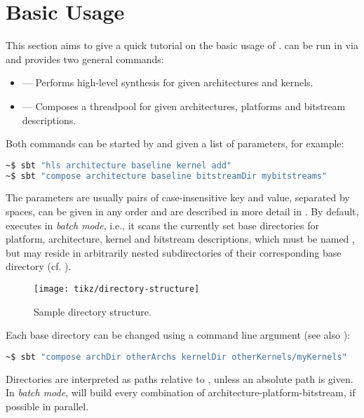 \section{Basic Usage}\label{sec:basic-usage}%
This section aims to give a quick tutorial on the basic usage of \tpc{}.
\tpc{} can be run in \tpchome{} via  and provides two general commands:

\begin{itemize}
  \item {} --- Performs high-level synthesis for given architectures and kernels.
  \item {} --- Composes a threadpool for given architectures, platforms and bitstream descriptions.
\end{itemize}

Both commands can be started by  and given a list of parameters, for example:
%
\begin{lstlisting}[language=bash]
~$ sbt "hls architecture baseline kernel add"
~$ sbt "compose architecture baseline bitstreamDir mybitstreams"
\end{lstlisting}
%
The parameters are usually pairs of case-insensitive key and value, separated by spaces, can be given in any order and are described in more detail in .
By default, \tpc{} executes in \emph{batch mode}, i.e., it scans the currently set base directories for platform, architecture, kernel and bitstream descriptions, which must be named , but may reside in arbitrarily nested subdirectories of their corresponding base directory (cf. ).
%
\begin{figure}
  \centering%
  \texttt{[image: tikz/directory-structure]}
  \caption{Sample directory structure.}
  \label{fig:dirs}
\end{figure}
%
Each base directory can be changed using a command line argument (see also ):
%
\begin{lstlisting}[language=bash]
~$ sbt "compose archDir otherArchs kernelDir otherKernels/myKernels"
\end{lstlisting}
%
Directories are interpreted as paths relative to \tpchome{}, unless an absolute path is given.
In \emph{batch mode}, \tpc{} will build every combination of architecture-platform-bitstream, if possible in parallel.

